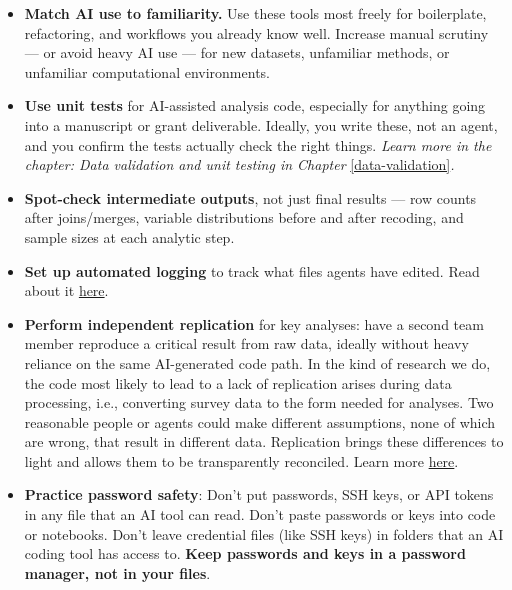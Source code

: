 \documentclass[
]{book}
\newcounter{none} %
\begin{document}
\begin{itemize}
\item
  \textbf{Match AI use to familiarity.} Use these tools most freely for
  boilerplate, refactoring, and workflows you already know well.
  Increase manual scrutiny --- or avoid heavy AI use --- for new datasets,
  unfamiliar methods, or unfamiliar computational environments.
\item
  \textbf{Use unit tests} for AI-assisted
  analysis code, especially for anything going into a manuscript or
  grant deliverable. Ideally, you write these, not an agent, and you
  confirm the tests actually check the right things. \emph{Learn more in the
  chapter: Data validation and unit testing in Chapter}
  \ref{data-validation}\emph{.}
\item
  \textbf{Spot-check intermediate outputs}, not just final results --- row
  counts after joins/merges, variable distributions before and after
  recoding, and sample sizes at each analytic step.
\item
  \textbf{Set up automated logging} to track what files agents have edited.
  Read about it
  \href{https://dev.to/boucle2026/how-to-see-everything-claude-code-does-audit-trail-hook-1g9j}{here}.
\item
  \textbf{Perform independent replication} for key analyses: have a second team
  member reproduce a critical result from raw data, ideally without
  heavy reliance on the same AI-generated code path. In the kind of
  research we do, the code most likely to lead to a lack of replication
  arises during data processing, i.e., converting survey data to the
  form needed for analyses. Two reasonable people or agents could make
  different assumptions, none of which are wrong, that result in
  different data. Replication brings these differences to light and
  allows them to be transparently reconciled. Learn more
  \href{https://gatesopenresearch-files.f1000.com/manuscripts/14274/333a74aa-51bb-44a9-af2b-209f67c2c425_13108_-_jade_benjamin-chung.pdf?doi=10.12688/gatesopenres.13108.1&gtmKey=GTM-MWFK8L5J&gtmAuth=hzk0Vc3qFsQYhCrIoHz68A&gtmPreview=env-1&immUserUrl=https\%3A\%2F\%2Fgates-proxy.f1krdev.com\%2Feditor\%2Fmember\%2Fshow\%2F&otid=275477bf-f17b-474f-befe-635d8fa9661a&s3BucketUrl=https\%3A\%2F\%2Fgatesopenresearch-files.f1000.com&submissionUrl=\%2Ffor-authors\%2Fpublish-your-research&transcendEnv=cm&transcendId=ef49a3f1-d8c1-47d6-88fc-50e41130631f&numberOfBrowsableCollections=5&numberOfBrowsableInstitutionalCollections=0&numberOfBrowsableGateways=14}{here}.
\item
  \textbf{Practice password safety}: Don't put passwords, SSH keys, or API tokens in any file that an AI tool can read. Don't paste passwords or keys into code or notebooks. Don't leave credential files (like SSH keys) in folders that an AI coding tool has access to. \textbf{Keep passwords and keys in a password manager, not in your files}.
\end{itemize}
\end{document}
